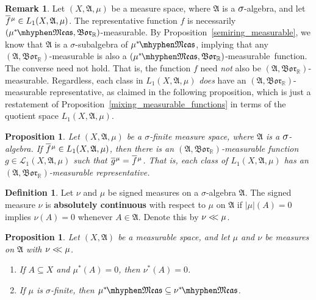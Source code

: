 \documentclass[
twoside=true,
paper=letter,
fontsize=11pt,
pagesize=auto,
leqno,
openany,
headsepline,
overfullrule,
]{scrbook}
\theoremstyle{plain}
\theoremstyle{plain}
\newtheorem{prop}[thm]{Proposition}
\theoremstyle{definition}
\newtheorem{defn}[thm]{Definition}
\newtheorem{rmk}[thm]{Remark}
\theoremstyle{bfnoteitalic}
\theoremstyle{bfnoteroman}
\newcommand{\term}[1]{\textbf{#1}\index{#1}}
\newcommand{\sigalg}[1]{\mathfrak{#1}}
\newcommand{\cali}[1]{\mathscr{#1}}
\newcommand{\borel}{\mathfrak{Bor}}
\newcommand{\textsigma}{\hbox{\large{$\sigma$}}\kern-1pt}
\newcommand{\abs}[1]{\left\vert#1\right\vert}
\newcommand{\R}{\mathbb{R}}
\newcommand{\sigmaalgebra}{\sigalg{A}}
\newcommand{\measurable}[1]{{#1}\mhyphen\mathfrak{Meas}}
\newcommand{\kernast}{\ast\kern-1pt}
\newcommand{\mbmeasurable}{$(\measurable{\measure^\kernast},\borel_\R)$\hyp{}measurable}
\newcommand{\measurespace}{X}
\newcommand{\abscont}{\mathrel{< \kern-3.5pt <}}
\newcommand{\measure}{\mu}
\newcommand{\measureii}{\nu}
\newcommand{\seti}{A}
\newcommand*\xbar[1]{%
   \hbox{%
     \vbox{%
       \hrule height 0.4pt %
       \kern0.4ex%
       \hbox{%
         \ensuremath{#1}%
       }%
     }%
   }%
}
\newcommand{\lebclass}[1]{\hspace{.5pt}\xbar{#1}\hspace{0.5pt}}
\newcommand{\ellclass}[2]{\lebclass{#1}^{#2}}
\begin{document}
\begin{rmk}
Let $(\measurespace,\sigmaalgebra,\measure)$ be a measure space, where $\sigmaalgebra$ is a $\textsigma$-algebra, and let $\ellclass{f}{\measure}\in L_1(\measurespace, \sigmaalgebra, \measure)$.  The representative function $f$ is necessarily \mbmeasurable. By Proposition~\ref{semiring_measurable}, we know that $\sigmaalgebra$ is a \textsigma-subalgebra of $\measurable{\measure^\kernast}$, implying that any  
$(\sigmaalgebra, \borel_\R)$\hyp{}measurable is also a  \mbmeasurable\ function.  The converse need not hold.  That is, the function $f$ need \emph{not} also be $(\sigmaalgebra, \borel_\R)$\hyp{}measurable. Regardless, each class in 
$L_1(\measurespace, \sigmaalgebra, \measure)$ \emph{does} have an
$(\sigmaalgebra, \borel_\R)$\hyp{}measurable representative, as claimed in the following proposition, which is just a restatement of Proposition~\ref{mixing_measurable_functions} in terms of the quotient space $L_1(\measurespace, \sigmaalgebra, \measure)$. 
\end{rmk}



\begin{prop}\label{a_measurable_representative}
Let $(\measurespace, \sigmaalgebra, \measure)$ be a \textsigma-finite measure space, where $\sigmaalgebra$ is a $\textsigma$-algebra. 
If $\ellclass{f}{\measure}\in L_1(\measurespace, \sigmaalgebra, \measure)$, then there is an 
$(\sigmaalgebra, \borel_\R)$\hyp{}measurable function 
$g\in \cali{L}_1(\measurespace, \sigmaalgebra, \measure)$ such that 
$\ellclass{g}{\measure} = \ellclass{f}{\measure}$. 
That is, each class of $L_1(\measurespace, \sigmaalgebra, \measure)$ has an 
$(\sigmaalgebra, \borel_\R)$\hyp{}measurable representative.  
\end{prop}


\begin{defn}\label{absolutely_continuous}
Let $\measureii$ and $\measure$ be signed measures on a \textsigma-algebra $\sigmaalgebra$.
The signed measure $\measureii$ is \term{absolutely continuous} with respect to $\measure$ on $\sigmaalgebra$ if 
$\abs{\measure}(\seti) = 0$ 
implies
$\measureii(\seti) = 0$ whenever $\seti\in\sigmaalgebra$. Denote this by 
$\measureii\abscont\measure$.
\end{defn}


\begin{prop}\label{abscont_properties}
Let $(\measurespace,\sigmaalgebra)$ be a measurable space, and let 
$\measure$ and $\measureii$ be measures on $\sigmaalgebra$ with 
$\measureii\abscont\measure$.
\begin{enumerate}
\item
If $\seti \subseteq \measurespace$ and 
$\measure^*(\seti) = 0$, then $\measureii^*(\seti) = 0$.
\item If $\measure$ is \textsigma-finite, then 
$\measurable{\measure^\kernast} \subseteq
\measurable{\measureii^\kernast}$.
\end{enumerate}
\end{prop}
\end{document}
